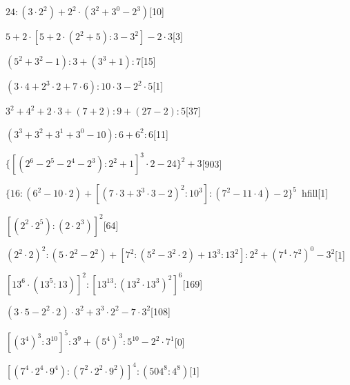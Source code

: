 \begin{esercizio} %
\(24:(3\cdot2^2)+2^2\cdot(3^2+3^0-2^3)\)\hfill[10]
\end{esercizio}
\begin{esercizio} %
\(5+2\cdot[5+2\cdot(2^2+5):3-3^2]-2\cdot3\)\hfill[3]
\end{esercizio}
\begin{esercizio} %
\((5^2+3^2-1):3+(3^3+1):7\)\hfill[15]
\end{esercizio}
\begin{esercizio} %
\((3\cdot4+2^3\cdot2+7\cdot6):10\cdot3-2^2\cdot5\)\hfill[1]
\end{esercizio}
\begin{esercizio} %
\(3^2+4^2+2\cdot3+(7+2):9+(27-2):5\)\hfill[37]
\end{esercizio}
\begin{esercizio} %
\((3^3+3^2+3^1+3^0-10):6+6^2:6\)\hfill[11]
\end{esercizio}
\begin{esercizio} %
\(\{[(2^6-2^5-2^4-2^3):2^2+1]^3\cdot2-24\}^2+3\)\hfill[903]
\end{esercizio}
\begin{esercizio} %
\(\{16:(6^2-10\cdot2)+[(7\cdot3+3^3\cdot3-2)^2:10^3]:(7^2-11\cdot4)-2\}^5\)\
hfill[1]
\end{esercizio}
\begin{esercizio} %
\([(2^2\cdot2^5):(2\cdot2^3)]^2\)\hfill[64]
\end{esercizio}
\begin{esercizio} %
\((2^2\cdot2)^2:(5\cdot2^2-2^2)+[7^2:(5^2-3^2\cdot2)+13^3:13^2]:2^2+(7^4\cdot7
^2)^0-3^2\)\hfill[1]
\end{esercizio}
\begin{esercizio} %
\([13^6\cdot(13^5:13)]^2:[13^{13}:(13^2\cdot13^3)^2]^6\)\hfill[169]
\end{esercizio}
\begin{esercizio} %
\((3\cdot5-2^2\cdot2)\cdot3^2+3^3\cdot2^2-7\cdot3^2\)\hfill[108]
\end{esercizio}
\begin{esercizio} %
\([(3^4)^3:3^{10}]^5:3^9+(5^4)^3:5^{10}-2^2\cdot7^1\)\hfill[0]
\end{esercizio}
\begin{esercizio} %
\([(7^4\cdot2^4\cdot9^4):(7^2\cdot2^2\cdot9^2)]^4:(504^8:4^8)\)\hfill[1]
\end{esercizio}

